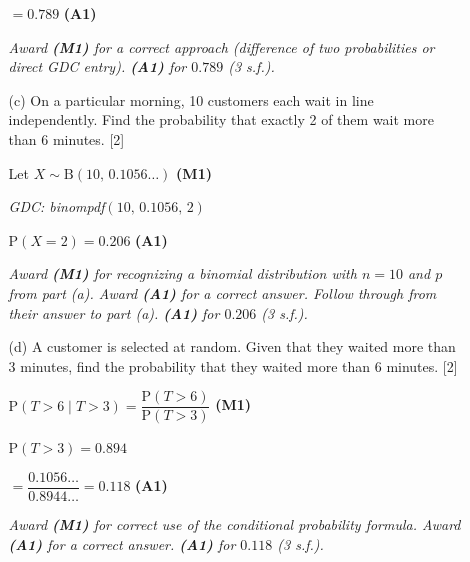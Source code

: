 \documentclass[12pt, twoside]{article}
\begin{document}
\begin{enumerate}[itemsep=0.15cm]
\begin{enumerate}[itemsep=0.3cm]
  $= 0.789$ \hfill \textbf{(A1)}

  \textit{Award \textbf{(M1)} for a correct approach (difference of two probabilities or direct GDC entry).
  \textbf{(A1)} for $0.789$ (3 s.f.).}

  \item[(c)] On a particular morning, 10 customers each wait in line independently.
  Find the probability that exactly 2 of them wait more than 6 minutes. \hfill [2]

  Let $X \sim \mathrm{B}(10,\, 0.1056\ldots)$ \hfill \textbf{(M1)}

  \textit{GDC: binompdf$(10,\, 0.1056,\, 2)$}

  $\mathrm{P}(X = 2) = 0.206$ \hfill \textbf{(A1)}

  \textit{Award \textbf{(M1)} for recognizing a binomial distribution with $n = 10$
  and $p$ from part (a). Award \textbf{(A1)} for a correct answer.
  Follow through from their answer to part (a).
  \textbf{(A1)} for $0.206$ (3 s.f.).}

  \item[(d)] A customer is selected at random. Given that they waited more than
  3 minutes, find the probability that they waited more than 6 minutes. \hfill [2]

  $\mathrm{P}(T > 6 \mid T > 3) = \dfrac{\mathrm{P}(T > 6)}{\mathrm{P}(T > 3)}$ \hfill \textbf{(M1)}

  $\mathrm{P}(T > 3) = 0.894$

  $= \dfrac{0.1056\ldots}{0.8944\ldots} = 0.118$ \hfill \textbf{(A1)}

  \textit{Award \textbf{(M1)} for correct use of the conditional probability formula.
  Award \textbf{(A1)} for a correct answer.
  \textbf{(A1)} for $0.118$ (3 s.f.).}
\end{enumerate}

\end{enumerate}
\end{document}
